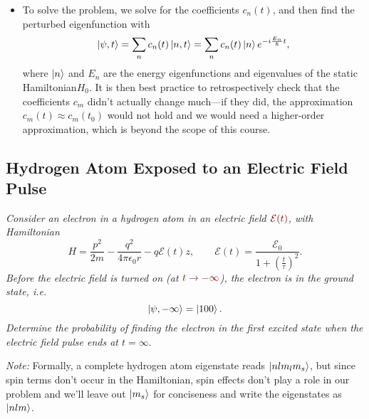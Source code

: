 \documentclass[11pt, a4paper]{article}
\newcommand{\dmath}[1]{\textcolor{Maroon}{#1}}  %
\newcommand{\Ham}{Hamiltonian\xspace}
\newcommand{\p}{\psi}  %
\newcommand{\E}{\mathcal{E}}  %
\begin{document}
\begin{itemize}
	\item To solve the problem, we solve for the coefficients $ c_{n}(t) $, and then find the perturbed eigenfunction with
	\begin{equation*}
		\ket{\p, t} = \sum_{n}c_{n}(t)\ket{n, t} = \sum_{n}c_{n}(t) \ket{n}e^{-i\frac{E_{n}}{\hbar}t},
	\end{equation*}
	where $ \ket{n} $ and $ E_{n} $ are the energy eigenfunctions and eigenvalues of the static \Ham $ H_{0} $. It is then best practice to retrospectively check that the coefficients $ c_{m} $ didn't actually change much---if they did, the approximation $ c_{m}(t) \approx c_{m}(t_{0}) $ would not hold and we would need a higher-order approximation, which is beyond the scope of this course.
	
\end{itemize}

\subsection{Hydrogen Atom Exposed to an Electric Field Pulse}
\textit{Consider an electron in a hydrogen atom in an electric field $ \dmath{\E(t)} $, with \Ham}
\begin{equation*}
	H = \frac{p^{2}}{2m} - \frac{q^{2}}{4 \pi \epsilon_{0} r} - q \E(t)z, \qquad \E(t) = \frac{\E_{0}}{1 + \left(\frac{t}{\tau}\right)^{2}}.
\end{equation*}
\textit{Before the electric field is turned on (at $ \dmath{t \to - \infty} $), the electron is in the ground state, i.e.}
\begin{equation*}
	\ket{\p, - \infty} = \ket{100}.
\end{equation*}
\textit{Determine the probability of finding the electron in the first excited state when the electric field pulse ends at $ t = \infty $}.

\vspace{2mm}
\textit{Note:} Formally, a complete hydrogen atom eigenstate reads $ \ket{nlm_{l}m_{s}} $, but since spin terms don't occur in the \Ham, spin effects don't play a role in our problem and we'll leave out $ \ket{m_{s}} $ for conciseness and write the eigenstates as $ \ket{nlm} $.
	
\end{document}
